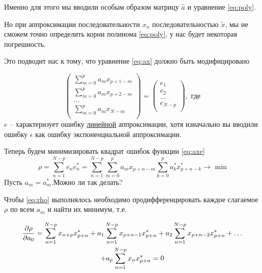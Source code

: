 \documentclass[a4paper,14pt]{extarticle}
\begin{document}
Именно для этого мы вводили особым образом матрицу $\hat a$ и уравнение
\eqref{eq:poly}. 

Но при аппроксимации последовательности $x_n$ последовательностью  $\tilde x$,
мы не сможем точно определить корни полинома  \eqref{eq:poly}, у нас будет
некоторая погрешность.

Это подводит нас к тому, что уравнение \eqref{eq:ax} должно быть
модифицировано 

 \begin{equation}
    \label{eq:axe}
    \begin{pmatrix}
        \sum\limits_{m=0}^{p} a_m x_{p+1-m} \\ 
        \sum\limits_{m=0}^{p} a_m x_{p+2-m} \\ 
        \dots \\ 
        \sum\limits_{m=0}^{p} a_m x_{N-m} \\ 
    \end{pmatrix}
    = 
    \begin{pmatrix}
        e_1 \\
        e_2 \\
        \dots \\
        e_{N-p} \\
    \end{pmatrix}, \text{ где}
\end{equation}
$e$ -- характеризует ошибку \underline{линейной} аппроксимации, хотя
изначально вы вводили ошибку $\epsilon$ как ошибку экспоненциальной
аппроксимации.

Теперь будем минимизировать квадрат ошибок функции \eqref{eq:axe}
\begin{equation}
    \label{eq:rho}
    \rho = \sum\limits_{n=1}^{N-p} e_n e_{n}^* = 
    \sum\limits_{n=1}^{N-p}
    \sum\limits_{m=0}^{p} a_m x_{p+n-m} 
    \sum\limits_{k=0}^{p} a_k^* x^*_{p+n-k} 
    \to \text{ min}
\end{equation}
{ \color{red} Пусть $a_m = a_m^*$.Можно ли так делать? }

Чтобы \eqref{eq:rho} выполнялось необходимо продифференцировать каждое
слагаемое $\rho$ по всем
$a_m$ и найти их минимум, т.е.

\begin{multline}
    \pdv{\rho}{a_0} = 
        \sum\limits_{n=1}^{N-p} x_{n+p}x^*_{p+n}  +
        a_1 \sum\limits_{n=1}^{N-p} x_{p+n-1}x^*_{p+n}  +
        a_2\sum\limits_{n=1}^{N-p} x_{p+n-2}x^*_{p+n} + \hdots 
        \\
        + a_p\sum\limits_{n=1}^{N-p} x_{n}x^*_{p+n} = 0
\end{multline}
\end{document}
